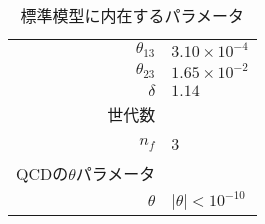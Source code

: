 \begin{itemize}
\begin{table}[ht]
\begin{center}
\begin{tabular}{rl}
                         $\theta_{13}$ & $ 3.10\times 10^{-4}$ \\
                         $\theta_{23}$ & $ 1.65\times 10^{-2}$ \\
                         $\delta$      & $ 1.14 $ \\\hline
      世代数 & \\
      $n_f$ & 3 \\\hline
        QCDの$\theta$パラメータ & \\
        $\theta$ & $ |\theta| < 10^{-10}$ \\\hline
    \end{tabular}
  \caption{標準模型に内在するパラメータ}
  \label{table:parameters}
  \end{center}
\end{table}
\begin{comment}
\begin{table}[ht]
  \begin{center}
    \begin{tabular}{cr|c}\hline\hline
      パラメータ& & 値 \\\hline\hline
      結合定数  & $g_1$ & 0.461  \\
                & $g_2$ & 0.652  \\
                & $g_3$ & 1.21   \\\hline
      ヒッグス: 真空期待値 & $v$  & 246\,[GeV]\\
                結合定数   &$\lambda$  & 0.13 \\\hline
                湯川定数 & $y_e$     & $2.94\times 10^{-6}$ \\
                         & $y_\mu$   & $6.07\times 10^{-4}$ \\
                         & $y_\tau$  & $1.02\times 10^{-2}$ \\
                         & $y_u$     & $1.24\times 10^{-5}$ \\
                         & $y_c$     & $7.11\times 10^{-3}$ \\
                         & $y_t$     & $9.92\times 10^{-1}$ \\
                         & $y_d$     & $2.70\times 10^{-5}$ \\
                         & $y_s$     & $5.36\times 10^{-4}$ \\
                         & $y_b$     & $2.41\times 10^{-2}$ \\\hline
                CKM行列 & $\theta_{12}$ & $ 1.66\times 10^{-5}$ \\

\end{comment}
\end{itemize}
